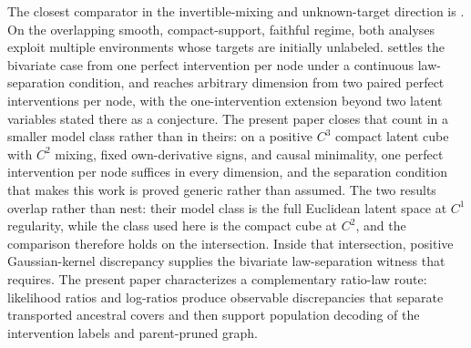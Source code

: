 The closest comparator in the invertible-mixing and unknown-target direction is \citet{vonKugelgenEtAl2023UnknownInterventions}. On the overlapping smooth, compact-support, faithful regime, both analyses exploit multiple environments whose targets are initially unlabeled. \citet[Theorem~3.2]{vonKugelgenEtAl2023UnknownInterventions} settles the bivariate case from one perfect intervention per node under a continuous law-separation condition, and \citet[Theorem~3.4]{vonKugelgenEtAl2023UnknownInterventions} reaches arbitrary dimension from two paired perfect interventions per node, with the one-intervention extension beyond two latent variables stated there as a conjecture. The present paper closes that count in a smaller model class rather than in theirs: on a positive \(C^3\) compact latent cube with \(C^2\) mixing, fixed own-derivative signs, and causal minimality, one perfect intervention per node suffices in every dimension, and the separation condition that makes this work is proved generic rather than assumed. The two results overlap rather than nest: their model class is the full Euclidean latent space at \(C^1\) regularity, while the class used here is the compact cube at \(C^2\), and the comparison therefore holds on the intersection. Inside that intersection, positive Gaussian-kernel discrepancy supplies the bivariate law-separation witness that \citet[Theorem~3.2]{vonKugelgenEtAl2023UnknownInterventions} requires. The present paper characterizes a complementary ratio-law route: likelihood ratios  and log-ratios  produce observable discrepancies that separate transported ancestral covers and then support population decoding of the intervention labels and parent-pruned graph.

